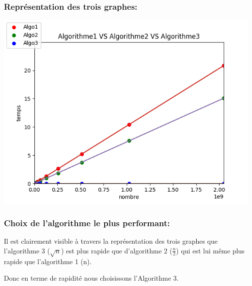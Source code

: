 \documentclass[12pt]{article}
\begin{document}
\subsubsection{Représentation des trois graphes:}

\includegraphics[width=1\textwidth]{graphe/Algorithme1_VS_Algorithme2_VS_Algorithme3.png}

\subsubsection{Choix de l'algorithme le plus performant:}
Il est clairement visible à travers la représentation des trois graphes que l'algorithme 3 ($\sqrt{n}$) est plus rapide que d'algorithme 2 ($\frac{n}{2}$) qui est lui même plus rapide que l'algorithme 1 (n).

Donc en terme de rapidité nous choisissons l'Algorithme 3.
\end{document}
